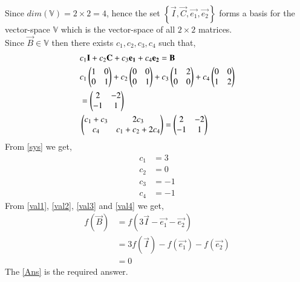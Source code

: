 \documentclass[journal,12pt,twocolumn]{IEEEtran}
\begin{document}
Since $dim(\mathbb{V}) = 2\times2 = 4$, hence the set $\left\{\vec{I},\vec{C},\vec{e_1}, \vec{e_2}\right\}$ forms a basis for the vector-space $\mathbb{V}$ which is the vector-space of all $2 \times 2$ matrices.\\
Since $\vec{B} \in \mathbb{V}$ then there exists $c_1,c_2,c_3,c_4$ such that,
\begin{align}
&c_1\mathbf{I}+c_2\mathbf{C}+c_3\mathbf{e_1}+c_4\mathbf{e_2} =\mathbf{B}\\
&c_1\begin{pmatrix}1&0\\0&1\end{pmatrix}+c_2\begin{pmatrix}0&0\\0&1\end{pmatrix}+c_3\begin{pmatrix}1&2\\0&0\end{pmatrix}+c_4\begin{pmatrix}0&0\\1&2\end{pmatrix}\\
&=\begin{pmatrix}2&-2\\-1&1\end{pmatrix}\\
&\begin{pmatrix}c_1+c_3&2c_3\\c_4&c_1+c_2+2c_4\end{pmatrix} = \begin{pmatrix}2&-2\\-1&1\end{pmatrix}\label{sys}
\end{align}
From \eqref{sys} we get,
\begin{align}
c_1 &= 3\label{val1}\\
c_2 &= 0\label{val2}\\
c_3 &= -1\label{val3}\\
c_4 &= -1\label{val4}
\end{align}
From \eqref{val1}, \eqref{val2}, \eqref{val3} and \eqref{val4} we get,
\begin{align}
f(\vec{B}) &= f(3\vec{I}-\vec{e_1}-\vec{e_2})\\
&= 3f(\vec{I})-f(\vec{e_1})-f(\vec{e_2})\\
&= 0\label{Ans}
\end{align}
The \eqref{Ans} is the required answer.
\end{document}
